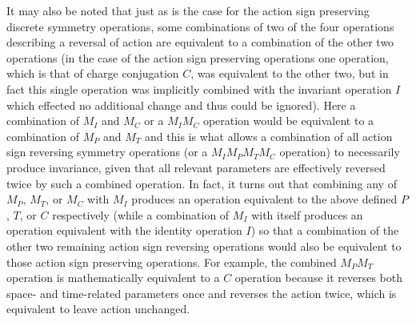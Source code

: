 \documentclass[notitlepage,12pt]{report}
\begin{document}
It may also be noted that just as is the case for the action sign preserving discrete symmetry operations, some combinations of two of the four operations describing a reversal of action are equivalent to a combination of the other two operations (in the case of the action sign preserving operations one operation, which is that of charge conjugation $C$, was equivalent to the other two, but in fact this single operation was implicitly combined with the invariant operation $I$ which effected no additional change and thus could be ignored). Here a combination of $M_I$ and $M_C$ or a $M_{I}M_{C}$ operation would be equivalent to a combination of $M_P$ and $M_T$ and this is what allows a combination of all action sign reversing symmetry operations (or a $M_{I}M_{P}M_{T}M_{C}$ operation) to necessarily produce invariance, given that all relevant parameters are effectively reversed twice by such a combined operation. In fact, it turns out that combining any of $M_P$, $M_T$, or $M_C$ with $M_I$ produces an operation equivalent to the above defined $P$, $T$, or $C$ respectively (while a combination of $M_I$ with itself produces an operation equivalent with the identity operation $I$) so that a combination of the other two remaining action sign reversing operations would also be equivalent to those action sign preserving operations. For example, the combined $M_{P}M_{T}$ operation is mathematically equivalent to a $C$ operation because it reverses both space- and time-related parameters once and reverses the action twice, which is equivalent to leave action unchanged.
\end{document}
